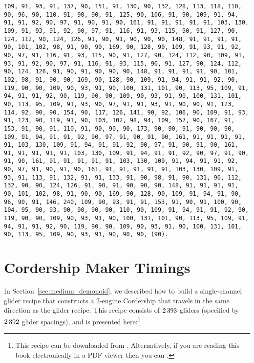 \begin{sloppypar}
	\noindent\tiny\texttt{109, 91, 93, 91, 137, 90, 151, 91, 130, 90, 132, 128, 113, 118, 110, 90, 96, 90, 110, 91, 90, 90, 91, 125, 90, 106, 91, 90, 109, 91, 94, 91, 91, 92, 90, 97, 91, 90, 91, 90, 161, 91, 91, 91, 91, 91, 103, 130, 109, 91, 93, 91, 92, 90, 97, 91, 116, 91, 93, 115, 90, 91, 127, 90, 124, 112, 90, 124, 126, 91, 90, 91, 90, 90, 90, 148, 91, 91, 91, 91, 90, 101, 102, 98, 91, 90, 90, 169, 90, 128, 90, 109, 91, 93, 91, 92, 90, 97, 91, 116, 91, 93, 115, 90, 91, 127, 90, 124, 112, 90, 109, 91, 93, 91, 92, 90, 97, 91, 116, 91, 93, 115, 90, 91, 127, 90, 124, 112, 90, 124, 126, 91, 90, 91, 90, 90, 90, 148, 91, 91, 91, 91, 90, 101, 102, 98, 91, 90, 90, 169, 90, 128, 90, 109, 91, 94, 91, 91, 92, 90, 119, 90, 90, 109, 90, 93, 91, 90, 100, 131, 101, 90, 113, 95, 109, 91, 94, 91, 91, 92, 90, 119, 90, 90, 109, 90, 93, 91, 90, 100, 131, 101, 90, 113, 95, 109, 91, 93, 90, 97, 91, 91, 93, 91, 90, 90, 91, 123, 114, 92, 90, 90, 154, 90, 117, 126, 141, 90, 92, 106, 90, 109, 91, 93, 91, 123, 90, 119, 91, 90, 103, 102, 98, 94, 109, 157, 90, 167, 91, 153, 91, 90, 91, 110, 91, 90, 90, 90, 173, 90, 90, 91, 90, 90, 90, 109, 91, 94, 91, 91, 92, 90, 97, 91, 90, 91, 90, 161, 91, 91, 91, 91, 91, 103, 130, 109, 91, 94, 91, 91, 92, 90, 97, 91, 90, 91, 90, 161, 91, 91, 91, 91, 91, 103, 130, 109, 91, 94, 91, 91, 92, 90, 97, 91, 90, 91, 90, 161, 91, 91, 91, 91, 91, 103, 130, 109, 91, 94, 91, 91, 92, 90, 97, 91, 90, 91, 90, 161, 91, 91, 91, 91, 91, 103, 130, 109, 91, 93, 91, 113, 91, 132, 91, 91, 133, 91, 90, 98, 91, 90, 131, 90, 112, 132, 90, 90, 124, 126, 91, 90, 91, 90, 90, 90, 148, 91, 91, 91, 91, 90, 101, 102, 98, 91, 90, 90, 169, 90, 128, 90, 109, 91, 94, 91, 90, 96, 90, 91, 146, 240, 109, 90, 93, 91, 91, 153, 91, 90, 91, 100, 90, 104, 95, 90, 93, 90, 90, 90, 90, 110, 90, 109, 91, 94, 91, 91, 92, 90, 119, 90, 90, 109, 90, 93, 91, 90, 100, 131, 101, 90, 113, 95, 109, 91, 94, 91, 91, 92, 90, 119, 90, 90, 109, 90, 93, 91, 90, 100, 131, 101, 90, 113, 95, 109, 90, 93, 91, 90, 90, 90, {\color{gray}(90)}.}\par
\end{sloppypar}


\section{Cordership Maker Timings}\label{sec:appendix_cordership_maker}

In Section~\ref{sec:medium_demonoid}, we described how to build a single-channel glider recipe that constructs a $2$-engine Cordership that travels in the same direction as the glider recipe. This recipe consists of $2{\,}393$ gliders (specified by $2{\,}392$ glider spacings), and is presented here:\footnote{This recipe can be downloaded from . Alternatively, if you are reading this book electronically in a PDF viewer then you can .}\\[-0.1cm]


